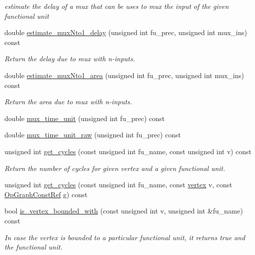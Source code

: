 \begin{DoxyCompactItemize}
\begin{DoxyCompactList}\small\item\em estimate the delay of a mux that can be uses to mux the input of the given functional unit \end{DoxyCompactList}\item 
double \hyperlink{classAllocationInformation_a395eb7ee43f8d119ec00f900af66b8cd}{estimate\+\_\+mux\+Nto1\+\_\+delay} (unsigned int fu\+\_\+prec, unsigned int mux\+\_\+ins) const
\begin{DoxyCompactList}\small\item\em Return the delay due to mux with n-\/inputs. \end{DoxyCompactList}\item 
double \hyperlink{classAllocationInformation_aff550cbb8329a2ce4a4fad783ff06544}{estimate\+\_\+mux\+Nto1\+\_\+area} (unsigned int fu\+\_\+prec, unsigned int mux\+\_\+ins) const
\begin{DoxyCompactList}\small\item\em Return the area due to mux with n-\/inputs. \end{DoxyCompactList}\item 
double \hyperlink{classAllocationInformation_a5b11be86fb9ed67e286c657e18a9163a}{mux\+\_\+time\+\_\+unit} (unsigned int fu\+\_\+prec) const
\item 
double \hyperlink{classAllocationInformation_adb31336cd112e8a0619fc8d26743bb0b}{mux\+\_\+time\+\_\+unit\+\_\+raw} (unsigned int fu\+\_\+prec) const
\item 
unsigned int \hyperlink{classAllocationInformation_a2ca79a1058c4e5a05ce0cd409a35e561}{get\+\_\+cycles} (const unsigned int fu\+\_\+name, const unsigned int v) const
\begin{DoxyCompactList}\small\item\em Return the number of cycles for given vertex and a given functional unit. \end{DoxyCompactList}\item 
unsigned int \hyperlink{classAllocationInformation_a27fb75577efef8e25dd62117e745a0a0}{get\+\_\+cycles} (const unsigned int fu\+\_\+name, const \hyperlink{graph_8hpp_abefdcf0544e601805af44eca032cca14}{vertex} v, const \hyperlink{op__graph_8hpp_a9a0b240622c47584bee6951a6f5de746}{Op\+Graph\+Const\+Ref} g) const
\item 
bool \hyperlink{classAllocationInformation_a37ec8afd2ce39886932cfbf4127cccad}{is\+\_\+vertex\+\_\+bounded\+\_\+with} (const unsigned int v, unsigned int \&fu\+\_\+name) const
\begin{DoxyCompactList}\small\item\em In case the vertex is bounded to a particular functional unit, it returns true and the functional unit. \end{DoxyCompactList}\item 

\end{DoxyCompactItemize}
